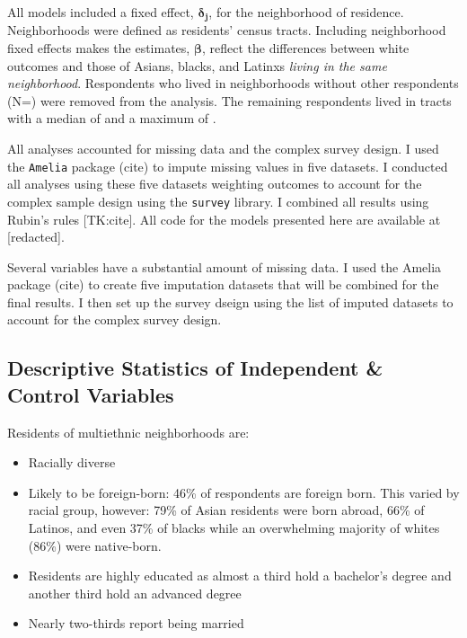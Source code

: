 \documentclass{baderart}
\providecommand{\tightlist}{%
  \setlength{\itemsep}{0pt}\setlength{\parskip}{0pt}}
\begin{document}
All models included a fixed effect, \(\mathbf{\delta_j}\), for the neighborhood of residence. Neighborhoods were defined as residents' census tracts. Including neighborhood fixed effects makes the estimates, \(\mathbf{\beta}\), reflect the differences between white outcomes and those of Asians, blacks, and Latinxs \emph{living in the same neighborhood}. Respondents who lived in neighborhoods without other respondents (N=\oneresp) were removed from the analysis. The remaining respondents lived in tracts with a median of \medNpertract and a maximum of \maxNpertract.

All analyses accounted for missing data and the complex survey design. I used the \texttt{Amelia} package (cite) to impute missing values in five datasets. I conducted all analyses using these five datasets weighting outcomes to account for the complex sample design using the \texttt{survey} library. I combined all results using Rubin's rules {[}TK:cite{]}. All code for the models presented here are available at {[}redacted{]}.

Several variables have a substantial amount of missing data. I used the
Amelia package (cite) to create five imputation datasets that will be
combined for the final results. I then set up the survey dseign using
the list of imputed datasets to account for the complex survey design.

\subsection{Descriptive Statistics of Independent \& Control
Variables}\label{descriptive-statistics-of-independent-control-variables}



Residents of multiethnic neighborhoods are:

\begin{itemize}
\tightlist
\item
  Racially diverse
\item
  Likely to be foreign-born: 46\% of respondents are foreign born. This
  varied by racial group, however: 79\% of Asian residents were born
  abroad, 66\% of Latinos, and even 37\% of blacks while an overwhelming
  majority of whites (86\%) were native-born.
\item
  Residents are highly educated as almost a third hold a bachelor's
  degree and another third hold an advanced degree
\item
  Nearly two-thirds report being married
\end{itemize}
\end{document}
